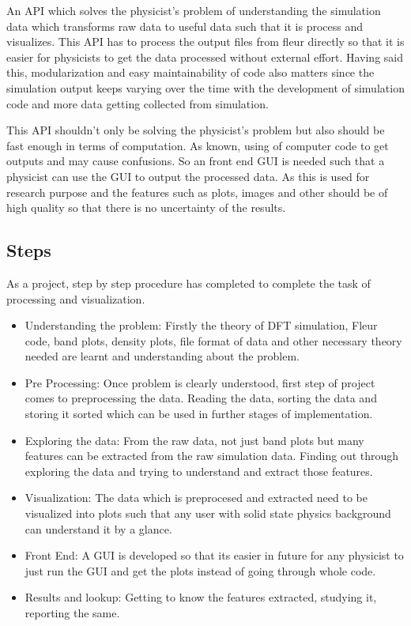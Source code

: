 An API which solves the physicist's problem of understanding the simulation data which transforms raw data to useful data such that it is process and visualizes. This API has to process the output files from fleur directly so that it is easier for physicists to get the data processed without external effort. Having said this, modularization and easy maintainability of code also matters since the simulation output keeps varying over the time with the development of simulation code and more data getting collected from simulation.

This API shouldn't only be solving the physicist's problem but also should be fast enough in terms of computation. As known, using of computer code to get outputs and may cause confusions. So an front end GUI is needed such that a physicist can use the GUI to output the processed data. As this is used for research purpose and the features such as plots, images and other should be of high quality so that there is no uncertainty of the results.

\subsection{Steps}

As a project, step by step procedure has completed to complete the task of processing and visualization.
\begin{itemize}
\item Understanding the problem: Firstly the theory of DFT simulation, Fleur code, band plots, density plots, file format of data and other necessary theory needed are learnt and understanding about the problem.
\item Pre Processing: Once problem is clearly understood, first step of project comes to preprocessing the data. Reading the data, sorting the data and storing it sorted which can be used in further stages of implementation.
\item Exploring the data: From the raw data, not just band plots but many features can be extracted from the raw simulation data. Finding out through exploring the data and trying to understand and extract those features.
\item Visualization: The data which is preprocesed and extracted need to be visualized into plots such that any user with solid state physics background can understand it by a glance.
\item Front End: A GUI is developed so that its easier in future for any physicist to just run the GUI and get the plots instead of going through whole code.
\item Results and lookup: Getting to know the features extracted, studying it, reporting the same.

\end{itemize}
